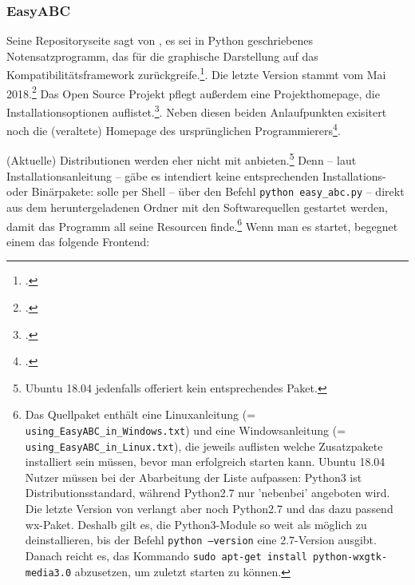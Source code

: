 %
%
%



\subsubsection{EasyABC}

\label{EasyABC}Seine Repositoryseite sagt von , es sei in Python
geschriebenes Notensatzprogramm, das für die graphische Darstellung auf das
Kompatibilitätsframework  zurückgreife.\footcite[vgl.][\nopage
wp]{EasyAbc2017a}. Die letzte Version stammt vom Mai
2018.\footcite[vgl.][\nopage wp]{EasyAbc2017c} Das Open Source Projekt pflegt
außerdem eine Projekthomepage, die Installationsoptionen
auflistet.\footcite[vgl.][\nopage wp]{EasyAbc2017b}. Neben diesen beiden
Anlaufpunkten exisitert noch die (veraltete) Homepage des ursprünglichen
Programmierers\footcite[vgl.][\nopage wp]{Liberg2015a}.

(Aktuelle) Distributionen werden  eher nicht mit
anbieten.\footnote{Ubuntu 18.04 jedenfalls offeriert kein entsprechendes Paket.}
Denn -- laut  Installationsanleitung -- gäbe es intendiert keine
entsprechenden Installations- oder Binärpakete:  solle per Shell --
über den Befehl \texttt{python easy\_abc.py} -- direkt aus dem heruntergeladenen
Ordner mit den Softwarequellen gestartet werden, damit das Programm all seine
Resourcen finde.\footnote{Das Quellpaket enthält eine Linuxanleitung (=
\texttt{using\_EasyABC\_in\_Windows.txt}) und eine Windowsanleitung (=
\texttt{using\_EasyABC\_in\_Linux.txt}), die jeweils auflisten welche
Zusatzpakete installiert sein müssen, bevor man  erfolgreich
starten kann. Ubuntu 18.04 Nutzer müssen bei der Abarbeitung der Liste
aufpassen: Python3 ist Distributionsstandard, während Python2.7 nur 'nebenbei'
angeboten wird. Die letzte Version von  verlangt aber noch
Python2.7 und das dazu passend wx-Paket. Deshalb gilt es, die Python3-Module so
weit als möglich zu deinstallieren, bis der Befehl \texttt{python --version}
eine 2.7-Version ausgibt. Danach reicht es, das Kommando \texttt{sudo apt-get
install python-wxgtk-media3.0} abzusetzen, um zuletzt  starten zu
können.} Wenn man es startet, begegnet einem das folgende Frontend:

